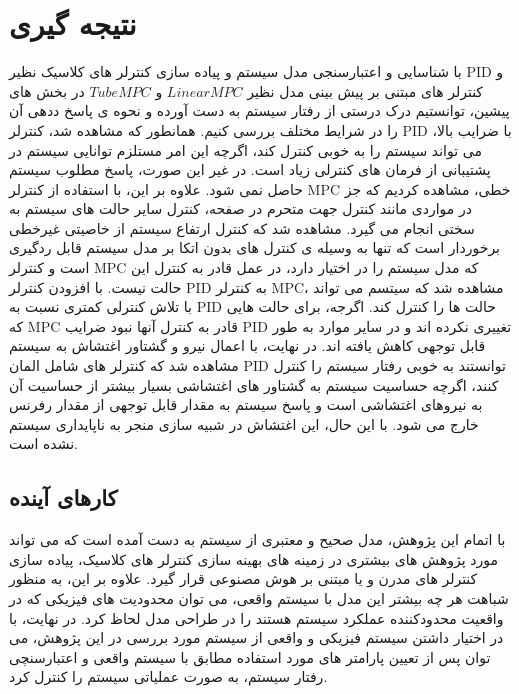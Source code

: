 \chapter{نتیجه گیری}

با شناسایی و اعتبارسنجی مدل سیستم و پیاده سازی کنترلر های کلاسیک نظیر PID و کنترلر های مبتنی بر پیش بینی مدل نظیر $Linear MPC$ و $Tube MPC$ در بخش های پیشین، توانستیم درک درستی از رفتار سیستم به دست آورده و نحوه ی پاسخ ددهی آن را در شرایط مختلف بررسی کنیم.
همانطور که مشاهده شد، کنترلر PID با ضرایب بالا، می تواند سیستم را به خوبی کنترل کند، اگرچه این امر مستلزم توانایی سیستم در پشتیبانی از فرمان های کنترلی زیاد است. در غیر این صورت، پاسخ مطلوب سیستم حاصل نمی شود. 
علاوه بر این، با استفاده از کنترلر MPC خطی، مشاهده کردیم که جز در مواردی مانند کنترل جهت متحرم در صفحه، کنترل سایر حالت های سیستم به سختی انجام می گیرد. مشاهده شد که کنترل ارتفاع سیستم از خاصیتی غیرخطی برخوردار است که تنها به وسیله ی کنترل های بدون اتکا بر مدل سیستم قابل ردگیری است و کنترلر MPC که مدل سیستم را در اختیار دارد، در عمل قادر به کنترل این حالت نیست. 
با افزودن کنترلر PID به کنترلر MPC، مشاهده شد که سیتسم می تواند با تلاش کنترلی کمتری نسبت به PID حالت ها را کنترل کند. اگرجه، برای حالت هایی که MPC قادر به کنترل آنها نبود ضرایب PID تغییری نکرده اند و در سایر موارد به طور قابل توجهی کاهش یافته اند. 
در نهایت، با اعمال نیرو و گشتاور اغتشاش به سیستم مشاهده شد که کنترلر های شامل المان PID توانستند به خوبی رفتار سیستم را کنترل کنند، اگرچه حساسیت سیستم به گشتاور های اغتشاشی بسیار بیشتر از حساسیت آن به نیروهای اغتشاشی است و پاسخ سیستم به مقدار قابل توجهی از مقدار رفرنس خارج می شود. با این حال، این اغتشاش در شبیه سازی منجر به ناپایداری سیستم نشده است.

\section{کارهای آینده}
با اتمام این پژوهش، مدل صحیح و معتبری از سیستم به دست آمده است که می تواند مورد پژوهش های بیشتری در زمینه های بهینه سازی کنترلر های کلاسیک، پیاده سازی کنترلر های مدرن و یا مبتنی بر هوش مصنوعی قرار گیرد. علاوه بر این، به منظور شباهت هر چه بیشتر این مدل با سیستم واقعی، می توان محدودیت های فیزیکی که در واقعیت محدودکننده عملکرد سیستم هستند را در طراحی مدل لحاظ کرد. 
در نهایت، با در اختیار داشتن سیستم فیزیکی و واقعی از سیستم مورد بررسی در این پژوهش، می توان پس از تعیین پارامتر های مورد استفاده مطابق با سیستم واقعی و اعتبارسنچی رفتار سیستم، به صورت عملیاتی سیستم را کنترل کرد.













